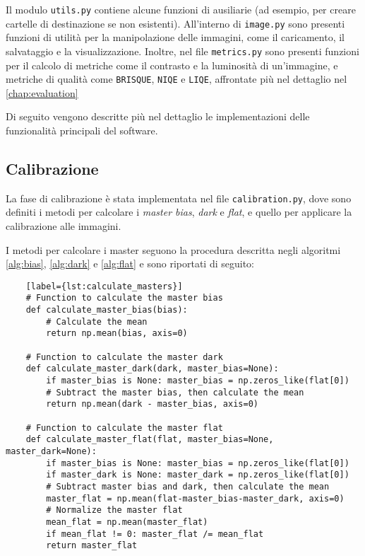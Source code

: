 Il modulo \texttt{utils.py} contiene alcune funzioni di ausiliarie (ad esempio, per creare cartelle di destinazione se non esistenti). All'interno di \texttt{image.py} sono presenti funzioni di utilità per la manipolazione delle immagini, come il caricamento, il salvataggio e la visualizzazione. Inoltre, nel file \texttt{metrics.py} sono presenti funzioni per il calcolo di metriche come il contrasto e la luminosità di un'immagine, e metriche di qualità come \texttt{BRISQUE}, \texttt{NIQE} e \texttt{LIQE}, affrontate più nel dettaglio nel \cref{chap:evaluation}

Di seguito vengono descritte più nel dettaglio le implementazioni delle funzionalità principali del software.

\subsection{Calibrazione} \label{subsec:calibration_impl}

La fase di calibrazione è stata implementata nel file \texttt{calibration.py}, dove sono definiti i metodi per calcolare i \textit{master bias}, \textit{dark} e \textit{flat}, e quello per applicare la calibrazione alle immagini.

I metodi per calcolare i master seguono la procedura descritta negli algoritmi \ref{alg:bias}, \ref{alg:dark} e \ref{alg:flat} e sono riportati di seguito:

\begin{lstlisting}
    [label={lst:calculate_masters}]
    # Function to calculate the master bias
    def calculate_master_bias(bias):
        # Calculate the mean
        return np.mean(bias, axis=0)

    # Function to calculate the master dark
    def calculate_master_dark(dark, master_bias=None):
        if master_bias is None: master_bias = np.zeros_like(flat[0])
        # Subtract the master bias, then calculate the mean
        return np.mean(dark - master_bias, axis=0)

    # Function to calculate the master flat
    def calculate_master_flat(flat, master_bias=None, master_dark=None):
        if master_bias is None: master_bias = np.zeros_like(flat[0])
        if master_dark is None: master_dark = np.zeros_like(flat[0])
        # Subtract master bias and dark, then calculate the mean
        master_flat = np.mean(flat-master_bias-master_dark, axis=0)   
        # Normalize the master flat
        mean_flat = np.mean(master_flat)
        if mean_flat != 0: master_flat /= mean_flat
        return master_flat
\end{lstlisting}

